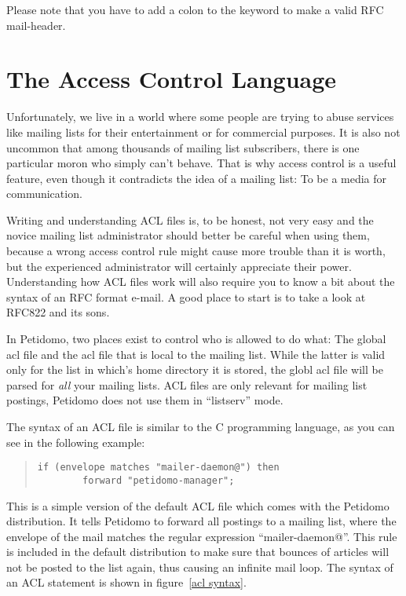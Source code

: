 \documentclass[a4paper,10pt]{scrreprt}
\begin{document}
Please note that you have to add a colon to the keyword to make a
valid RFC mail-header.


\section{The Access Control Language}
\label{acl}

Unfortunately, we live in a world where some people are trying to
abuse services like mailing lists for their entertainment or for
commercial purposes. It is also not uncommon that among thousands of
mailing list subscribers, there is one particular moron who simply
can't behave. That is why access control is a useful feature, even
though it contradicts the idea of a mailing list: To be a media for
communication.

Writing and understanding ACL files is, to be honest, not very easy
and the novice mailing list administrator should better be careful
when using them, because a wrong access control rule might cause more
trouble than it is worth, but the experienced administrator will
certainly appreciate their power. Understanding how ACL files work
will also require you to know a bit about the syntax of an RFC format
e-mail. A good place to start is to take a look at RFC822 and its
sons.

In Petidomo, two places exist to control who is allowed to do what:
The global acl file and the acl file that is local to the mailing
list. While the latter is valid only for the list in which's home
directory it is stored, the globl acl file will be parsed for
\emph{all} your mailing lists. ACL files are only relevant for mailing
list postings, Petidomo does not use them in ``listserv'' mode.

The syntax of an ACL file is similar to the C programming
language, as you can see in the following example:
\begin{quote}
\begin{verbatim}
if (envelope matches "mailer-daemon@") then
        forward "petidomo-manager";
\end{verbatim}
\end{quote}

This is a simple version of the default ACL file which comes with the
Petidomo distribution. It tells Petidomo to forward all postings to a
mailing list, where the envelope of the mail matches the regular
expression ``mailer-daemon@''. This rule is included in the default
distribution to make sure that bounces of articles will not be posted
to the list again, thus causing an infinite mail loop. The syntax of
an ACL statement is shown in figure~\ref{acl syntax}.
\end{document}
